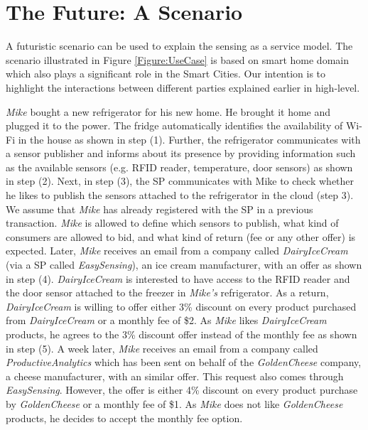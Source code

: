 \documentclass[times]{ettauth}
\begin{document}
\vspace{-6pt}

\section{The Future: A Scenario}
\label{sec:The Future}



A futuristic scenario can be used to explain the sensing as a service model. The scenario illustrated in Figure \ref{Figure:UseCase} is based on smart home domain which also plays a significant role in the Smart Cities. Our intention is to highlight the interactions between different parties explained earlier in high-level.
 
\textit{Mike} bought a new refrigerator for his new home. He brought it home and plugged it to the power. The fridge automatically identifies the availability of Wi-Fi in the house as shown in step (1). Further, the refrigerator communicates with a sensor publisher and informs about its presence by providing information such as the available sensors (e.g. RFID reader, temperature, door sensors) as shown in  step (2). 
Next, in step (3), the SP communicates with Mike to check whether he likes to publish the sensors attached to the refrigerator in the cloud (step 3). We assume that \textit{Mike} has already registered with the SP in a previous transaction. \textit{Mike} is allowed to define which sensors to publish, what kind of consumers are allowed to bid, and what kind of return (fee or any other offer) is expected. Later, \textit{Mike} receives an email from a company called \textit{DairyIceCream} (via a SP called \textit{EasySensing}), an ice cream manufacturer, with an offer as shown in  step (4). \textit{DairyIceCream} is interested to have access to the RFID reader and the door sensor attached to the freezer in  \textit{Mike's} refrigerator. As a return, \textit{DairyIceCream} is willing to offer either 3\% discount on every product purchased from \textit{DairyIceCream} or a monthly fee of \$2. As \textit{Mike} likes \textit{DairyIceCream} products, he agrees to the 3\% discount offer instead of the monthly fee as shown in  step (5). A week later, \textit{Mike} receives an email from a company called \textit{ProductiveAnalytics} which has been sent on behalf of the \textit{GoldenCheese} company, a cheese manufacturer, with an similar offer. This request  also comes through \textit{EasySensing}. However, the offer is either 4\% discount on every product purchase by \textit{GoldenCheese} or a monthly fee of \$1. As \textit{Mike} does not like \textit{GoldenCheese} products, he decides to accept the monthly fee option. 
\end{document}
